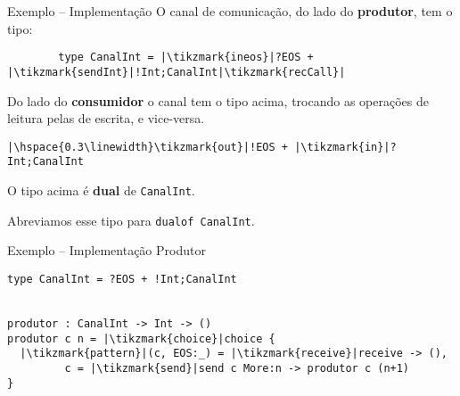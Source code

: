 \begin{frame}[fragile]{Exemplo -- Implementação}
  O canal de comunicação, do lado do \textbf{produtor}, tem o tipo:
  \vspace*{4mm}
  \begin{lstlisting}
        type CanalInt = |\tikzmark{ineos}|?EOS + |\tikzmark{sendInt}|!Int;CanalInt|\tikzmark{recCall}|
\end{lstlisting} 
 
 

 Do lado do \textbf{consumidor} o canal tem o tipo acima, trocando as operações de leitura pelas de escrita, e vice-versa.
\vspace*{4mm} 
\begin{lstlisting}
|\hspace{0.3\linewidth}\tikzmark{out}|!EOS + |\tikzmark{in}|?Int;CanalInt
\end{lstlisting}


\centering
\begin{tcolorbox}
  O tipo acima é \textbf{dual} de \lstinline|CanalInt|.

  Abreviamos esse tipo para \lstinline|dualof CanalInt|.
\end{tcolorbox}

\end{frame}

\begin{frame}[fragile]{Exemplo -- Implementação  \hfill \color{mLightBrown}Produtor}
  \begin{lstlisting}[xleftmargin=.15\textwidth, xrightmargin=.15\textwidth]
type CanalInt = ?EOS + !Int;CanalInt

    
produtor : CanalInt -> Int -> ()
produtor c n = |\tikzmark{choice}|choice {
  |\tikzmark{pattern}|(c, EOS:_) = |\tikzmark{receive}|receive -> (),
         c = |\tikzmark{send}|send c More:n -> produtor c (n+1)
}
  \end{lstlisting}


  
\end{frame}


